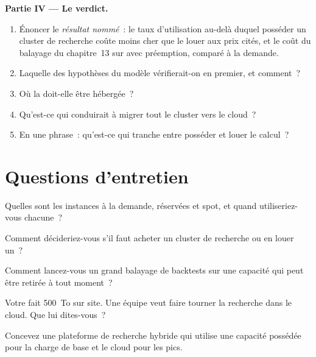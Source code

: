 \begin{problem}
\medskip\noindent\textbf{Partie IV --- Le verdict.}
\begin{enumerate}[resume]
\item Énoncer le \emph{résultat nommé}~: le taux d'utilisation au-delà duquel posséder un cluster de recherche coûte moins cher que le louer aux prix cités, et
le coût du balayage du chapitre~13 sur  avec préemption, comparé à la demande.
\item Laquelle des hypothèses du modèle vérifierait-on en premier, et comment~?
\item Où la  doit-elle être hébergée~?
\item Qu'est-ce qui conduirait à migrer tout le cluster vers le cloud~?
\item En une phrase~: qu'est-ce qui tranche entre posséder et louer le calcul~?
\end{enumerate}
\end{problem}

\section{Questions d'entretien}

\begin{interviewq}\label{iq:pl:cloud-against-on-premises:1}
Quelles sont les instances à la demande, réservées et spot, et quand utiliseriez-vous chacune~?
\end{interviewq}

\begin{interviewq}\label{iq:pl:cloud-against-on-premises:2}
Comment décideriez-vous s'il faut acheter un cluster de recherche ou en louer un~?
\end{interviewq}

\begin{interviewq}\label{iq:pl:cloud-against-on-premises:3}
Comment lancez-vous un grand balayage de backtests sur une capacité qui peut être retirée à tout moment~?
\end{interviewq}

\begin{interviewq}\label{iq:pl:cloud-against-on-premises:4}
Votre  fait 500~To sur site. Une équipe veut faire tourner la recherche dans le cloud. Que lui dites-vous~?
\end{interviewq}

\begin{interviewq}\label{iq:pl:cloud-against-on-premises:5}
Concevez une plateforme de recherche hybride qui utilise une capacité possédée pour la charge de base et le cloud pour les pics.
\end{interviewq}

